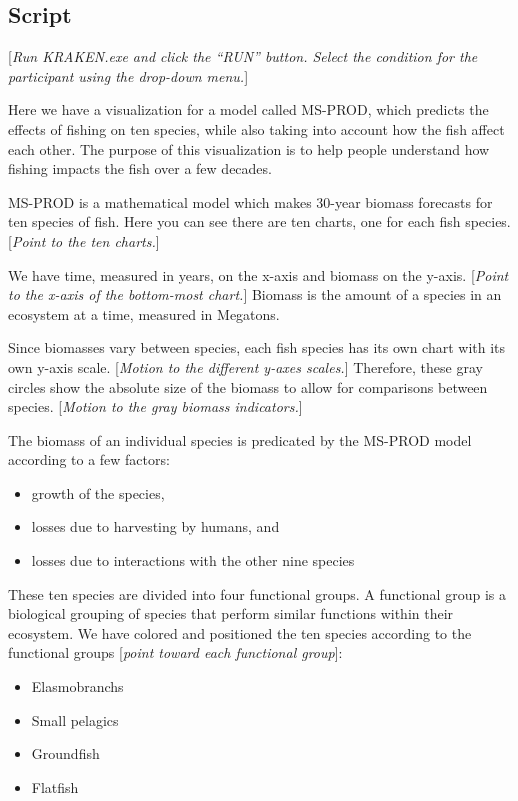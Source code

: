 {{{\subsection{Script}

[\textit{Run KRAKEN.exe and click the ``RUN'' button. Select the condition for the participant using the drop-down menu.}]

Here we have a visualization for a model called MS-PROD, which predicts the effects of fishing on ten species, while also taking into account how the fish affect each other.  The purpose of this visualization is to help people understand how fishing impacts the fish over a few decades.

MS-PROD is a mathematical model which makes 30-year biomass forecasts for ten species of fish.  Here you can see there are ten charts, one for each fish species.  [\textit{Point to the ten charts.}]

We have time, measured in years, on the x-axis and biomass on the y-axis.  [\textit{Point to the x-axis of the bottom-most chart.}]  Biomass is the amount of a species in an ecosystem at a time, measured in Megatons.

Since biomasses vary between species, each fish species has its own chart with its own y-axis scale.  [\textit{Motion to the different y-axes scales.}]  Therefore, these gray circles show the absolute size of the biomass to allow for comparisons between species.  [\textit{Motion to the gray biomass indicators.}]

The biomass of an individual species is predicated by the MS-PROD model according to a few factors:

\begin{itemize}
\item growth of the species,
\item losses due to harvesting by humans, and
\item losses due to interactions with the other nine species
\end{itemize}

These ten species are divided into four functional groups.  A functional group is a biological grouping of species that perform similar functions within their ecosystem.  We have colored and positioned the ten species according to the functional groups [\textit{point toward each functional group}]:

\begin{itemize}
\item Elasmobranchs 
\item Small pelagics 
\item Groundfish
\item Flatfish
\end{itemize}

}}}
